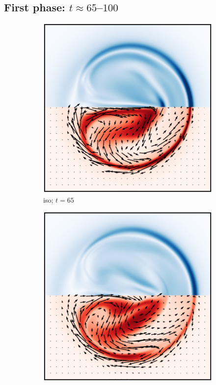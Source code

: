 \subsection{First phase: $t\approx65$--$100$}

\begin{figure}[t]
  \begin{subfigure}[t]{0.32\textwidth}
    \centering
    \includegraphics[width=\linewidth]{slices/final_isotropic_current_density_0013.pdf}
    \caption{iso; $t=65$}
    \label{fig:final_isotropic_current_density_0013}
  \end{subfigure}
  \hfill
  \begin{subfigure}[t]{0.32\textwidth}
    \centering
    \includegraphics[width=\linewidth]{slices/final_isotropic_current_density_0015.pdf}

\end{subfigure}
\end{figure}
